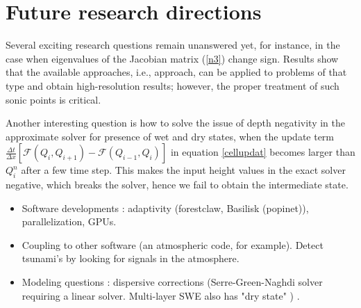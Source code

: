 \documentclass[10pt,a4paper]{article}
\begin{document}
	\section{ Future research directions}
	Several exciting research questions remain unanswered yet, for instance, in the case when eigenvalues of the Jacobian matrix (\eqref{n3}) change sign. Results show that the available approaches, i.e.,  \citet{ba-le-mi-ro:2003} approach, can be applied to problems of that type and obtain high-resolution results; however, the proper treatment of such sonic points is critical. 
	
	Another interesting question is  how to solve the issue of depth negativity in the approximate solver for presence of wet and dry states, when the update term $  \frac{\Delta t}{\Delta x} \left[ \mathcal{F}(Q_{i} , Q_{i+1} ) - \mathcal{F}(Q_{i-1} , Q_{i} ) \right]$ in equation \eqref{cellupdat} becomes larger than $Q_{i}^{n}$  after a few time step. This makes the input height values in the exact solver negative, which breaks the solver, hence we fail to obtain the intermediate state. 

	\begin{itemize}
	\item Software developments : adaptivity (forestclaw, Basilisk (popinet)), parallelization, GPUs. \cite{qi-le-mo:2018,po:2015,be-ge-le-ma:2011}   
	\item Coupling to other software (an atmospheric code, for example).  Detect tsunami's by looking for signals in the atmosphere.
	\item Modeling questions : dispersive corrections (Serre-Green-Naghdi solver  requiring a linear solver.  Multi-layer SWE also has "dry state" ) \cite{la-bo:2009,po:2020,po:2015}.
	\end{itemize}
	
	
	
	
	
	
	
	
	
\end{document}
